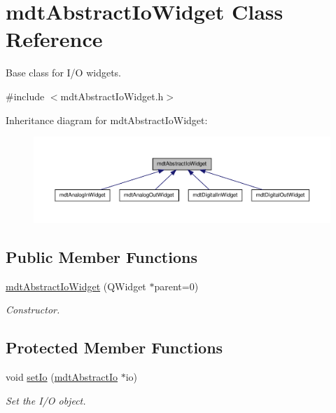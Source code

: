 \hypertarget{classmdt_abstract_io_widget}{
\section{mdtAbstractIoWidget Class Reference}
\label{classmdt_abstract_io_widget}
}


Base class for I/O widgets.  




{\ttfamily \#include $<$mdtAbstractIoWidget.h$>$}



Inheritance diagram for mdtAbstractIoWidget:\nopagebreak
\begin{figure}[H]
\begin{center}
\leavevmode
\includegraphics[width=400pt]{classmdt_abstract_io_widget__inherit__graph}
\end{center}
\end{figure}
\subsection*{Public Member Functions}
\begin{DoxyCompactItemize}
\item 
\hyperlink{classmdt_abstract_io_widget_a43208dbc9b2948561f5840bcd8fb9128}{mdtAbstractIoWidget} (QWidget $\ast$parent=0)
\begin{DoxyCompactList}\small\item\em Constructor. \end{DoxyCompactList}\end{DoxyCompactItemize}
\subsection*{Protected Member Functions}
\begin{DoxyCompactItemize}
\item 
void \hyperlink{classmdt_abstract_io_widget_ad6a9374234c5450dbfd261dfa43d628c}{setIo} (\hyperlink{classmdt_abstract_io}{mdtAbstractIo} $\ast$io)
\begin{DoxyCompactList}\small\item\em Set the I/O object. \end{DoxyCompactList}\end{DoxyCompactItemize}
